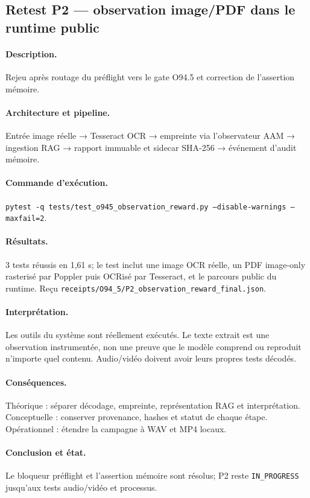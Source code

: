\documentclass[11pt,a4paper]{article}
\begin{document}
\subsection{Retest P2 — observation image/PDF dans le runtime public}
\paragraph{Description.} Rejeu après routage du préflight vers le gate O94.5 et correction de l'assertion mémoire.
\paragraph{Architecture et pipeline.} Entrée image réelle → Tesseract OCR → empreinte via l'observateur AAM → ingestion RAG → rapport immuable et sidecar SHA-256 → événement d'audit mémoire.
\paragraph{Commande d'exécution.} \texttt{pytest -q tests/test\_o945\_observation\_reward.py --disable-warnings --maxfail=2}.
\paragraph{Résultats.} 3 tests réussis en 1,61 s; le test inclut une image OCR réelle, un PDF image-only rasterisé par Poppler puis OCRisé par Tesseract, et le parcours public du runtime. Reçu \texttt{receipts/O94\_5/P2\_observation\_reward\_final.json}.
\paragraph{Interprétation.} Les outils du système sont réellement exécutés. Le texte extrait est une observation instrumentée, non une preuve que le modèle comprend ou reproduit n'importe quel contenu. Audio/vidéo doivent avoir leurs propres tests décodés.
\paragraph{Conséquences.} Théorique : séparer décodage, empreinte, représentation RAG et interprétation. Conceptuelle : conserver provenance, hashes et statut de chaque étape. Opérationnel : étendre la campagne à WAV et MP4 locaux.
\paragraph{Conclusion et état.} Le bloqueur préflight et l'assertion mémoire sont résolus; P2 reste \texttt{IN\_PROGRESS} jusqu'aux tests audio/vidéo et processus.
\end{document}
